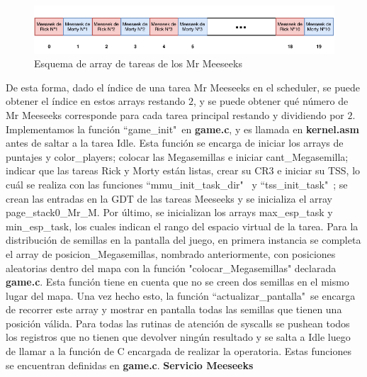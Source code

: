 \documentclass[a4paper]{article}
\begin{document}
\begin{figure}[h]
	\centering
	\includegraphics[scale=0.9]{img/TareasSinRickyMorty.pdf}
	\caption{Esquema de array de tareas de los Mr Meeseeks}
\end{figure}

\justify
De esta forma, dado el índice de una tarea Mr Meeseeks en el scheduler, se puede obtener el índice en estos arrays restando $2$, y se puede obtener qué número de Mr Meeseeks corresponde para cada tarea principal restando y dividiendo por $2$.
\justify
Implementamos la función ``game_init"\ en \textbf{game.c}, y es llamada en \textbf{kernel.asm} antes de saltar a la tarea Idle. Esta función se encarga de iniciar los arrays de puntajes y color_players; colocar las Megasemillas e iniciar cant_Megasemilla; indicar que las tareas Rick y Morty están listas, crear su CR3 e iniciar su TSS, lo cuál se realiza con las funciones ``mmu_init_task_dir" \ y ``tss_init_task"\ ; se crean las entradas en la GDT de las tareas Meeseeks y se inicializa el array page_stack0_Mr_M. Por último, se inicializan los arrays max_esp_task y min_esp_task, los cuales indican el rango del espacio virtual de la tarea. 
\justify
Para la distribución de semillas en la pantalla del juego, en primera instancia se completa el array de posicion_Megasemillas, nombrado anteriormente, con posiciones aleatorias dentro del mapa con la función "colocar_Megasemillas" declarada \textbf{game.c}. Esta función tiene en cuenta que no se creen dos semillas en el mismo lugar del mapa. Una vez hecho esto, la función ``actualizar_pantalla"\ se encarga de recorrer este array y mostrar en pantalla todas las semillas que tienen una posición válida.
\justify
Para todas las rutinas de atención de syscalls se pushean todos los registros que no tienen que devolver ningún resultado y se salta a Idle luego de llamar a la función de C encargada de realizar la operatoria. Estas funciones se encuentran definidas en \textbf{game.c}.
\justify
\textbf{Servicio Meeseeks}
\justify
\end{document}
